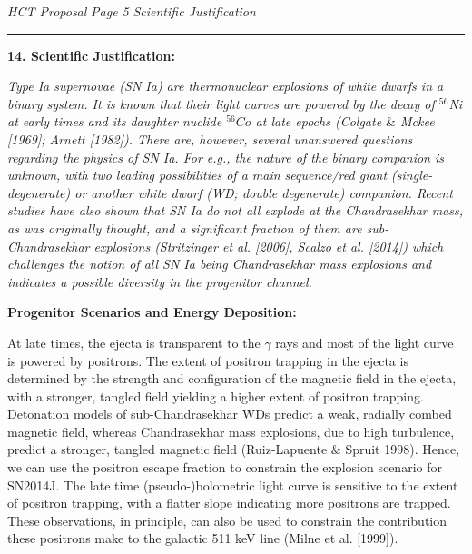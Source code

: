 \documentclass[11pt]{article}
\begin{document}
\newpage
{\it HCT Proposal}\hskip 5cm {\it Page 5} \hfill {\it Scientific Justification}\\[1mm]
\hrule
{\bf 14. Scientific Justification:} {\sl Type Ia supernovae (SN Ia) are thermonuclear explosions of white dwarfs in a binary system.  It is known that their light curves are powered by the decay of $^{56}$Ni at early times and its daughter nuclide $^{56}Co$ at late epochs (Colgate $\&$ Mckee [1969]; Arnett [1982]).  There are, however, several unanswered questions regarding the physics of SN Ia. For e.g., the nature of the binary companion is unknown, with two leading possibilities of a main sequence/red giant (single-degenerate) or another white dwarf (WD; double degenerate) companion. Recent studies have also shown that SN Ia do not all explode at the Chandrasekhar mass, as was originally thought, and a significant fraction of them are sub-Chandrasekhar explosions (Stritzinger et al. [2006], Scalzo et al. [2014]) which challenges the notion of all SN Ia being Chandrasekhar mass explosions and indicates a possible diversity in the progenitor channel.    %

\textbf{Progenitor Scenarios and Energy Deposition:}

At late times, the ejecta is transparent to the $\gamma$ rays and most of the light curve is powered by positrons. The extent of positron trapping in the ejecta is determined by the strength and configuration of the magnetic field in the ejecta, with a stronger, tangled field yielding a higher extent of positron trapping. Detonation models of sub-Chandrasekhar WDs predict a weak, radially combed magnetic field, whereas Chandrasekhar mass explosions, due to high turbulence, predict a  stronger, tangled magnetic field (Ruiz-Lapuente $\&$ Spruit 1998). Hence, we can use the positron escape fraction to constrain the explosion scenario for SN2014J. The late time (pseudo-)bolometric light curve is sensitive to the extent of positron trapping, with a flatter slope indicating more positrons are trapped.  These observations, in principle, can also be used to constrain the contribution these positrons make to the galactic 511 keV line (Milne et al. [1999]).

}
\end{document}
